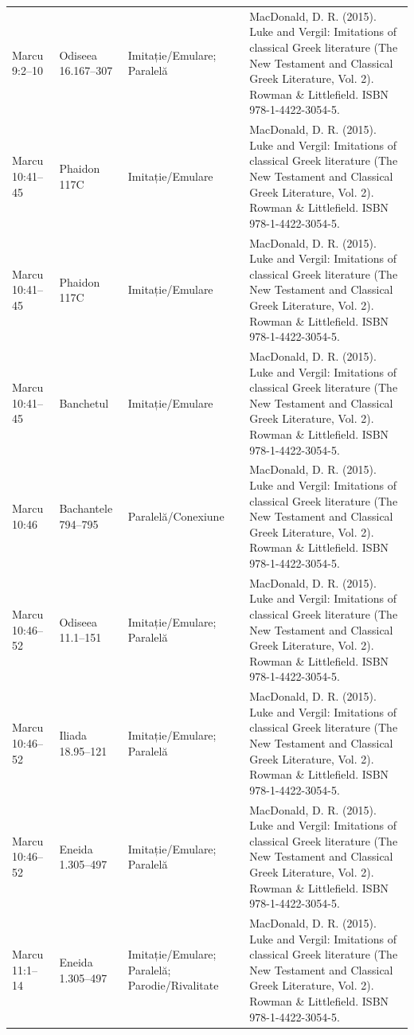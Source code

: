 \documentclass[12pt,a4paper,twoside,openany]{book}
\begin{document}
\begin{longtable}{L{1.4cm}L{1.7cm}L{3.1cm}L{8.4cm}}
Marcu 9:2–10 & Odiseea 16.167–307 & Imitație/Emulare; Paralelă & MacDonald, D. R. (2015). Luke and Vergil: Imitations of classical Greek literature (The New Testament and Classical Greek Literature, Vol. 2). Rowman \& Littlefield. ISBN 978-1-4422-3054-5. \\
Marcu 10:41–45 & Phaidon 117C & Imitație/Emulare & MacDonald, D. R. (2015). Luke and Vergil: Imitations of classical Greek literature (The New Testament and Classical Greek Literature, Vol. 2). Rowman \& Littlefield. ISBN 978-1-4422-3054-5. \\
Marcu 10:41–45 & Phaidon 117C & Imitație/Emulare & MacDonald, D. R. (2015). Luke and Vergil: Imitations of classical Greek literature (The New Testament and Classical Greek Literature, Vol. 2). Rowman \& Littlefield. ISBN 978-1-4422-3054-5. \\
Marcu 10:41–45 & Banchetul & Imitație/Emulare & MacDonald, D. R. (2015). Luke and Vergil: Imitations of classical Greek literature (The New Testament and Classical Greek Literature, Vol. 2). Rowman \& Littlefield. ISBN 978-1-4422-3054-5. \\
Marcu 10:46 & Bachantele 794–795 & Paralelă/Conexiune & MacDonald, D. R. (2015). Luke and Vergil: Imitations of classical Greek literature (The New Testament and Classical Greek Literature, Vol. 2). Rowman \& Littlefield. ISBN 978-1-4422-3054-5. \\
Marcu 10:46–52 & Odiseea 11.1–151 & Imitație/Emulare; Paralelă & MacDonald, D. R. (2015). Luke and Vergil: Imitations of classical Greek literature (The New Testament and Classical Greek Literature, Vol. 2). Rowman \& Littlefield. ISBN 978-1-4422-3054-5. \\
Marcu 10:46–52 & Iliada 18.95–121 & Imitație/Emulare; Paralelă & MacDonald, D. R. (2015). Luke and Vergil: Imitations of classical Greek literature (The New Testament and Classical Greek Literature, Vol. 2). Rowman \& Littlefield. ISBN 978-1-4422-3054-5. \\
Marcu 10:46–52 & Eneida 1.305–497 & Imitație/Emulare; Paralelă & MacDonald, D. R. (2015). Luke and Vergil: Imitations of classical Greek literature (The New Testament and Classical Greek Literature, Vol. 2). Rowman \& Littlefield. ISBN 978-1-4422-3054-5. \\
Marcu 11:1–14 & Eneida 1.305–497 & Imitație/Emulare; Paralelă; Parodie/Rivalitate & MacDonald, D. R. (2015). Luke and Vergil: Imitations of classical Greek literature (The New Testament and Classical Greek Literature, Vol. 2). Rowman \& Littlefield. ISBN 978-1-4422-3054-5. \\

\end{longtable}
\end{document}
